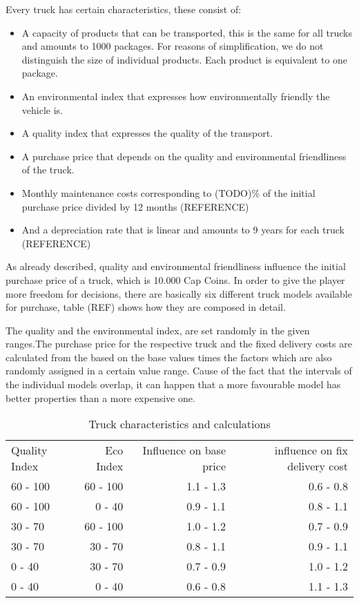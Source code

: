 Every truck has certain characteristics, these consist of:
\begin{itemize}
    \item A capacity of products that can be transported, this is the same for all trucks and amounts to 1000 packages. For reasons of simplification, we do not distinguish the size of individual products.  Each product is equivalent to one package. 
    \item An environmental index that expresses how environmentally friendly the vehicle is.
    \item A quality index that expresses the quality of the transport.
    \item A purchase price that depends on the quality and environmental friendliness of the truck.
    \item Monthly maintenance costs corresponding to (TODO)\% of the initial purchase price divided by 12 months (REFERENCE)
    \item And a depreciation rate that is linear and amounts to 9 years for each truck (REFERENCE) 
\end{itemize}

As already described, quality and environmental friendliness influence the initial purchase price of a truck, which is 10.000 Cap Coins. In order to give the player more freedom for decisions, there are basically six different truck models available for purchase, table (REF) shows how they are composed in detail. 

The quality and the environmental index, are set randomly in the given ranges.The purchase price for the respective truck and the fixed delivery costs are calculated from the based on the base values times the factors which are also randomly assigned in a certain value range.
Cause of the fact that the intervals of the individual models overlap, it can happen that a more favourable model has better properties than a more expensive one.


\begin{table}[ht]
    \centering
    \begin{tabular}{|l|r|r|r|}
    \hline
    Quality Index & Eco Index & Influence on base price & influence on fix delivery cost \\
    60 - 100      & 60 - 100   & 1.1 - 1.3   & 0.6 - 0.8       \\
    60 - 100      & 0 - 40     & 0.9 - 1.1   & 0.8 - 1.1       \\
    30 - 70       & 60 - 100   & 1.0 - 1.2   & 0.7 - 0.9       \\
    30 - 70       & 30 - 70    & 0.8 - 1.1   & 0.9 - 1.1       \\
    0 - 40        & 30 - 70    & 0.7 - 0.9   & 1.0 - 1.2       \\
    0 - 40        & 0 - 40     & 0.6 - 0.8   & 1.1 - 1.3       \\
    \hline
    \end{tabular}
    \caption{Truck characteristics and calculations}
    \label{Truck_characteristics}
\end{table}

